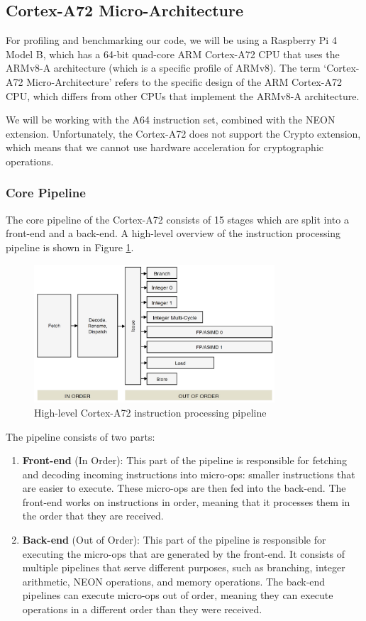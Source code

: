 \documentclass[11pt,a4paper]{report}
\theoremstyle{definition}
\begin{document}
\subsection{Cortex-A72 Micro-Architecture}
For profiling and benchmarking our code, we will be using a Raspberry Pi 4 Model B, which has a 64-bit quad-core ARM Cortex-A72 CPU that uses the ARMv8-A architecture (which is a specific profile of ARMv8). The term `Cortex-A72 Micro-Architecture' refers to the specific design of the ARM Cortex-A72 CPU, which differs from other CPUs that implement the ARMv8-A architecture.

We will be working with the A64 instruction set, combined with the NEON extension. Unfortunately, the Cortex-A72 does not support the Crypto extension, which means that we cannot use hardware acceleration for cryptographic operations.

\subsubsection{Core Pipeline}
The core pipeline of the Cortex-A72 consists of 15 stages which are split into a front-end and a back-end. A high-level overview of the instruction processing pipeline \cite{CortexA72OptGuide} is shown in Figure \ref{fig:cortexa72pipeline}.

\begin{figure}
  \centering
  \includegraphics[width=0.8\textwidth]{armv8/Cortex-A72-pipeline-simplified.jpg}
  \caption{High-level Cortex-A72 instruction processing pipeline \cite{CortexA72OptGuide}}
  \label{fig:cortexa72pipeline}
\end{figure}

The pipeline consists of two parts:
\begin{enumerate}
  \item \textbf{Front-end} (In Order): This part of the pipeline is responsible for fetching and decoding incoming instructions into micro-ops: smaller instructions that are easier to execute. These micro-ops are then fed into the back-end. The front-end works on instructions in order, meaning that it processes them in the order that they are received.
  \item \textbf{Back-end} (Out of Order): This part of the pipeline is responsible for executing the micro-ops that are generated by the front-end. It consists of multiple pipelines that serve different purposes, such as branching, integer arithmetic, NEON operations, and memory operations. The back-end pipelines can execute micro-ops out of order, meaning they can execute operations in a different order than they were received.
\end{enumerate}
\end{document}

